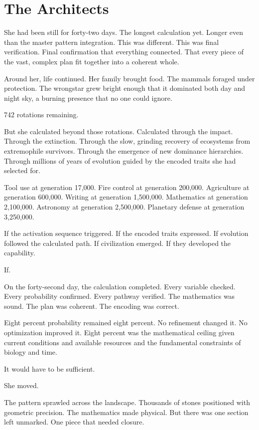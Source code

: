 \chapter{The Architects}
\label{ch:10}


She had been still for forty-two days. The longest calculation yet. Longer even than the master pattern integration. This was different. This was final verification. Final confirmation that everything connected. That every piece of the vast, complex plan fit together into a coherent whole.

Around her, life continued. Her family brought food. The mammals foraged under protection. The wrongstar grew bright enough that it dominated both day and night sky, a burning presence that no one could ignore.

742 rotations remaining.

But she calculated beyond those rotations. Calculated through the impact. Through the extinction. Through the slow, grinding recovery of ecosystems from extremophile survivors. Through the emergence of new dominance hierarchies. Through millions of years of evolution guided by the encoded traits she had selected for.

Tool use at generation 17,000.
Fire control at generation 200,000.
Agriculture at generation 600,000.
Writing at generation 1,500,000.
Mathematics at generation 2,100,000.
Astronomy at generation 2,500,000.
Planetary defense at generation 3,250,000.

If the activation sequence triggered. If the encoded traits expressed. If evolution followed the calculated path. If civilization emerged. If they developed the capability.

If.

On the forty-second day, the calculation completed. Every variable checked. Every probability confirmed. Every pathway verified. The mathematics was sound. The plan was coherent. The encoding was correct.

Eight percent probability remained eight percent. No refinement changed it. No optimization improved it. Eight percent was the mathematical ceiling given current conditions and available resources and the fundamental constraints of biology and time.

It would have to be sufficient.

She moved.

\scenebreak

The pattern sprawled across the landscape. Thousands of stones positioned with geometric precision. The mathematics made physical. But there was one section left unmarked. One piece that needed closure.

